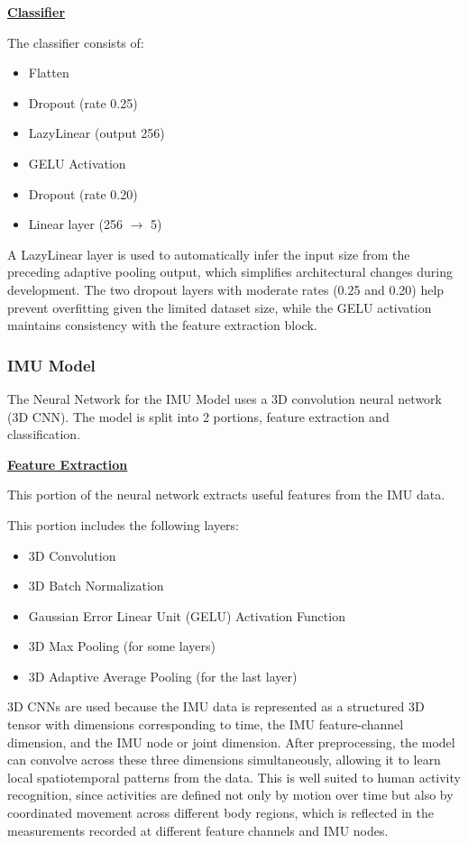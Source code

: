 \textbf{\underline{Classifier}}

The classifier consists of:
\begin{itemize}
    \item Flatten
    \item Dropout (rate 0.25)
    \item LazyLinear (output 256)
    \item GELU Activation
    \item Dropout (rate 0.20)
    \item Linear layer (256 \(\rightarrow\) 5)
\end{itemize}

A LazyLinear layer is used to automatically infer the input size from the preceding adaptive pooling output, which simplifies architectural changes during development. The two dropout layers with moderate rates (0.25 and 0.20) help prevent overfitting given the limited dataset size, while the GELU activation maintains consistency with the feature extraction block.


\subsubsection{IMU Model}
The Neural Network for the IMU Model uses a 3D convolution neural network (3D CNN). The model is split into 2 portions, feature extraction and classification.

\textbf{\underline{Feature Extraction}}

This portion of the neural network extracts useful features from the IMU data.

This portion includes the following layers:
\begin{itemize}
    \item 3D Convolution 
    \item 3D Batch Normalization
    \item Gaussian Error Linear Unit (GELU) Activation Function
    \item 3D Max Pooling (for some layers)
    \item 3D Adaptive Average Pooling (for the last layer)
\end{itemize}

3D CNNs are used because the IMU data is represented as a structured 3D tensor with dimensions corresponding to time, the IMU feature-channel dimension, and the IMU node or joint dimension. After preprocessing, the model can convolve across these three dimensions simultaneously, allowing it to learn local spatiotemporal patterns from the data. This is well suited to human activity recognition, since activities are defined not only by motion over time but also by coordinated movement across different body regions, which is reflected in the measurements recorded at different feature channels and IMU nodes.

